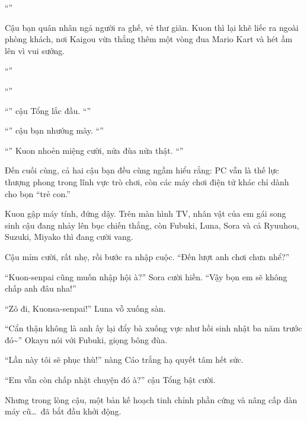 \documentclass[../main.tex]{subfiles}
\begin{document}
``''

Cậu bạn quân nhân ngả người ra ghế, vẻ thư giãn. Kuon thì lại khẽ liếc ra ngoài phòng khách, nơi Kaigou vừa thắng thêm một vòng đua Mario Kart và hét ầm lên vì vui sướng.

``''

``''

``'' cậu Tổng lắc đầu. ``''

``'' cậu bạn nhướng mày. ``''

``'' Kuon nhoẻn miệng cười, nửa đùa nửa thật. ``''

Đến cuối cùng, cả hai cậu bạn đều cùng ngầm hiểu rằng: PC vẫn là thế lực thượng phong trong lĩnh vực trò chơi, còn các máy chơi điện tử khác chỉ dành cho bọn ``trẻ con.''

Kuon gập máy tính, đứng dậy. Trên màn hình TV, nhân vật của em gái song sinh cậu đang nhảy lên bục chiến thắng, còn Fubuki, Luna, Sora và cả Ryuuhou, Suzuki, Miyako thì đang cười vang.

Cậu mỉm cười, rất nhẹ, rồi bước ra nhập cuộc. ``Đến lượt anh chơi chưa nhể?''

``Kuon-senpai cũng muốn nhập hội à?'' Sora cười hiền. ``Vậy bọn em sẽ không chấp anh đâu nha!''

``Zô đi, Kuonsa-senpai!'' Luna vỗ xuống sàn.

``Cẩn thận không là anh ấy lại đẩy bà xuống vực như hồi sinh nhật ba năm trước đó\~{}'' Okayu nói với Fubuki, giọng bông đùa.

``Lần này tôi sẽ phục thù!'' nàng Cáo trắng hạ quyết tâm hết sức.

``Em vẫn còn chấp nhặt chuyện đó à?'' cậu Tổng bật cười.

Nhưng trong lòng cậu, một bản kế hoạch tinh chỉnh phần cứng và nâng cấp dàn máy cũ\dots\ đã bắt đầu khởi động.
\end{document}
